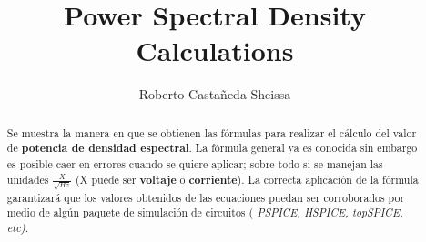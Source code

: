 \documentclass[letterpaper,10pt,twocolumn]{article}
\title{Power Spectral Density Calculations}
\author{Roberto Casta\~neda Sheissa}
\begin{document}
\maketitle

\begin{abstract}
Se muestra la manera en que se obtienen las f\'ormulas para realizar el c\'alculo del valor de \textbf{potencia de densidad espectral}. La f\'ormula general ya es conocida sin embargo es posible caer en errores cuando se quiere aplicar; sobre todo si se manejan las unidades $\frac{X}{\sqrt{Hz}}$ (X puede ser {\bf voltaje} o {\bf corriente}). La correcta aplicaci\'on de la f\'ormula garantizar\'a que los valores obtenidos de las ecuaciones puedan ser corroborados por medio de alg\'un paquete de simulaci\'on de circuitos (\it{ PSPICE, HSPICE, topSPICE, etc}). 
\end{abstract}
\end{document}
